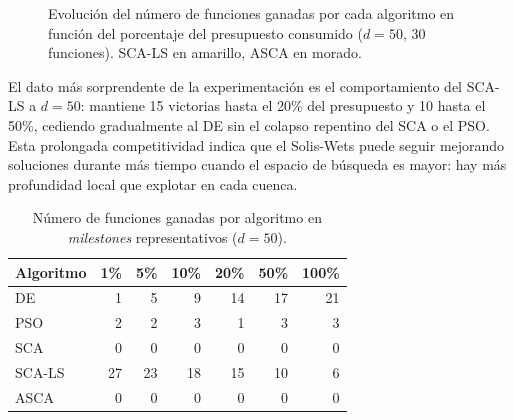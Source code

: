 \documentclass[12pt,a4paper]{article}
\begin{document}
\begin{figure}[H]
\caption{Evolución del número de funciones ganadas por cada algoritmo en función del porcentaje del presupuesto consumido ($d=50$, 30 funciones). SCA-LS en amarillo, ASCA en morado.}
\label{fig:convergencia_wins_sca_ls_d50}
\end{figure}
 
El dato más sorprendente de la experimentación es el comportamiento del SCA-LS a $d=50$: mantiene 15 victorias hasta el 20\% del presupuesto y 10 hasta el 50\%, cediendo gradualmente al DE sin el colapso repentino del SCA o el PSO. Esta prolongada competitividad indica que el Solis-Wets puede seguir mejorando soluciones durante más tiempo cuando el espacio de búsqueda es mayor: hay más profundidad local que explotar en cada cuenca.
 
\begin{table}[H]
\centering
\caption{Número de funciones ganadas por algoritmo en \textit{milestones} representativos ($d=50$).}
\label{tab:resumen_victorias_sca_ls_d50}
\renewcommand{\arraystretch}{1.2}
\begin{tabular}{lrrrrrr}
\toprule
\textbf{Algoritmo} & \textbf{1\%} & \textbf{5\%} & \textbf{10\%} & \textbf{20\%} & \textbf{50\%} & \textbf{100\%} \\
\midrule
DE      &  1 &  5 &  9 & 14 & 17 & 21 \\
PSO     &  2 &  2 &  3 &  1 &  3 &  3 \\
SCA     &  0 &  0 &  0 &  0 &  0 &  0 \\
SCA-LS  & 27 & 23 & 18 & 15 & 10 &  6 \\
ASCA    &  0 &  0 &  0 &  0 &  0 &  0 \\
\bottomrule
\end{tabular}
\end{table}
 
\end{document}
